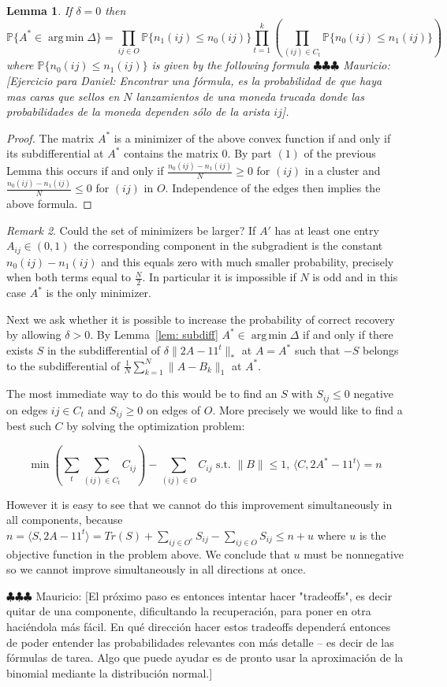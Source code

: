 \documentclass[12pt]{amsart}
\newtheorem{lemma}{Lemma}[section]
\theoremstyle{remark}
\newtheorem{remark}[lemma]{Remark}
\DeclareMathOperator*{\argmin}{arg\,min}
\newcommand{\PP}{\mathbb{P}}
\newcommand{\mv}[1]{{\color{red} \sf $\clubsuit\clubsuit\clubsuit$ Mauricio: [#1]}}
\begin{document}
\begin{lemma} If $\delta=0$ then 
\[\PP\{A^*\in\argmin\Delta \} =\prod_{ij\in O} \PP\{n_1(ij)\leq n_0(ij)\} \prod_{t=1}^k \left(\prod_{(ij)\in C_t}\PP\{n_0(ij)\leq n_1(ij)\}\right)\]
where $\PP\{n_0(ij)\leq n_1(ij)\}$ is given by the following formula 
\mv{Ejercicio para Daniel: Encontrar una f\'ormula, es la probabilidad de que haya mas caras que sellos en $N$ lanzamientos de una moneda trucada donde las probabilidades de la moneda dependen s\'olo de la arista $ij$}.
\end{lemma}
\begin{proof} The matrix $A^*$ is a minimizer of the above convex function if and only if its subdifferential at $A^*$ contains the matrix $0$. By part $(1)$ of the previous Lemma this occurs if and only if $\frac{n_0(ij)-n_1(ij)}{N}\geq 0$ for $(ij)$ in a cluster and 
$\frac{n_0(ij)-n_1(ij)}{N}\leq 0$ for $(ij)$ in $O$. Independence of the edges then implies the above formula.  
\end{proof}
\begin{remark} Could the set of minimizers be larger? If $A'$ has at least one entry $A_{ij}\in (0,1)$ the corresponding component in the subgradient is the constant $n_0(ij)-n_1(ij)$ and this equals zero with much smaller probability, precisely when both terms equal to $\frac{N}{2}$. In particular it is impossible if $N$ is odd and in this case $A^*$ is the only minimizer.
\end{remark}

Next we ask whether it is possible to increase the probability of correct recovery by allowing $\delta>0$. By Lemma~\ref{lem: subdiff} $A^*\in \argmin \Delta$ if and only if there exists $S$ in the subdifferential of $\delta\|2A-11^t\|_*$ at $A=A^*$ such that $-S$ belongs to the subdifferential of $\frac{1}{N}\sum_{k=1}^N\|A-B_k\|_1$ at $A^*$. 

The most immediate way to do this would be to find an $S$ with $S_{ij}\leq 0$ negative on edges $ij\in C_t$ and $S_{ij}\geq 0$ on edges of $O$. More precisely we would like to find a best such $C$ by solving the optimization problem:

\[
\min \left(\sum_{t}\sum_{(ij)\in C_t} C_{ij}\right)-\sum_{(ij)\in O} C_{ij} \text{ s.t. $\|B\|\leq 1$, $\langle C, 2A^*-11^t\rangle = n$} 
\]

However it is easy to see that we cannot do this improvement simultaneously in all components, because $n=\langle S, 2A-11^t\rangle = Tr(S)+\sum_{ij \in O^c} S_{ij} -\sum_{ij \in O} S_{ij}\leq n+u$ where $u$ is the objective function in the problem above. We conclude that $u$ must be nonnegative so we cannot improve simultaneously in all directions at once.

\mv{El pr\'oximo paso es entonces intentar hacer "tradeoffs", es decir quitar de una componente, dificultando la recuperaci\'on, para poner en otra haci\'endola m\'as f\'acil. En qu\'e direcci\'on hacer estos tradeoffs depender\'a entonces de poder entender las probabilidades relevantes con m\'as detalle -- es decir de las f\'ormulas de tarea. Algo que puede ayudar es de pronto usar la aproximación de la binomial mediante la distribuci\'on normal.}
\end{document}
